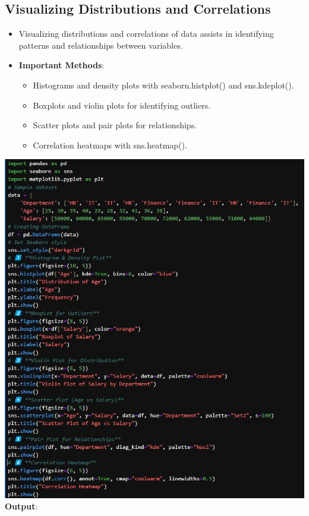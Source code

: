 \documentclass{article}
\begin{document}
\subsection{Visualizing Distributions and Correlations}
\begin{itemize}
    \item Visualizing distributions and correlations of data assists in identifying patterns and relationships between variables.
\item \textbf{Important Methods}:
    \begin{itemize}
    \item Histograms and density plots with seaborn.histplot() and sns.kdeplot().
    \item Boxplots and violin plots for identifying outliers.
    \item Scatter plots and pair plots for relationships.
    \item Correlation heatmaps with sns.heatmap().
    \end{itemize}
\end{itemize}
\includegraphics[width=17cm,height=20
cm]{Visualizing.jpeg}
\newpage
\textbf{Output}:
\end{document}
